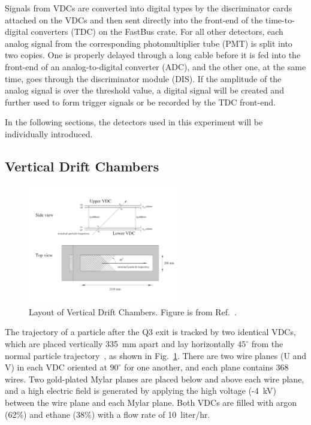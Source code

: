  Signals from VDCs are converted into digital types by the discriminator cards attached on the VDCs and then sent directly into the front-end of the time-to-digital converters (TDC) on the FastBus crate. For all other detectors, each analog signal from the corresponding photomultiplier tube (PMT) is split into two copies. One is properly delayed through a long cable before it is fed into the front-end of an analog-to-digital converter (ADC), and the other one, at the same time, goes through the discriminator module (DIS). If the amplitude of the analog signal is over the threshold value, a digital signal will be created and further used to form trigger signals or be recorded by the TDC front-end. 
 
 In the following sections, the detectors used in this experiment will be individually introduced.

\subsection{Vertical Drift Chambers}
\begin{figure}[!ht]
 \begin{center}
  \includegraphics[width=0.6\textwidth]{./figures/vdc/vdc}
  \caption[Layout of Vertical Drift Chambers]{\footnotesize{Layout of Vertical Drift Chambers. Figure is from Ref.~\cite{halla_nim}.}}
  \label{vdc}
 \end{center}
\end{figure}
 The trajectory of a particle after the Q3 exit is tracked by two identical VDCs, which are placed vertically 335~mm apart and lay horizontally $\mathrm{45^{\circ}}$ from the normal particle trajectory~\cite{halla_nim}, as shown in Fig.~\ref{vdc}. There are two wire planes (U and V) in each VDC oriented at $\mathrm{90^{\circ}}$ for one another, and each plane contains 368 wires. Two gold-plated Mylar planes are placed below and above each wire plane, and a high electric field is generated by applying the high voltage (-4~kV) between the wire plane and each Mylar plane. Both VDCs are filled with argon (62\%) and ethane (38\%) with a flow rate of 10~liter/hr. 
 
